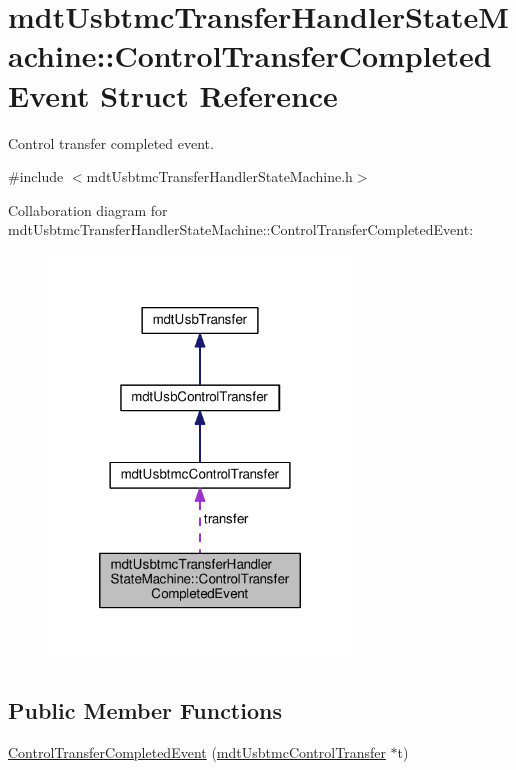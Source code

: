 \hypertarget{structmdt_usbtmc_transfer_handler_state_machine_1_1_control_transfer_completed_event}{\section{mdt\-Usbtmc\-Transfer\-Handler\-State\-Machine\-:\-:Control\-Transfer\-Completed\-Event Struct Reference}
\label{structmdt_usbtmc_transfer_handler_state_machine_1_1_control_transfer_completed_event}
}


Control transfer completed event.  




{\ttfamily \#include $<$mdt\-Usbtmc\-Transfer\-Handler\-State\-Machine.\-h$>$}



Collaboration diagram for mdt\-Usbtmc\-Transfer\-Handler\-State\-Machine\-:\-:Control\-Transfer\-Completed\-Event\-:\nopagebreak
\begin{figure}[H]
\begin{center}
\leavevmode
\includegraphics[width=228pt]{structmdt_usbtmc_transfer_handler_state_machine_1_1_control_transfer_completed_event__coll__graph}
\end{center}
\end{figure}
\subsection*{Public Member Functions}
\begin{DoxyCompactItemize}
\item 
\hyperlink{structmdt_usbtmc_transfer_handler_state_machine_1_1_control_transfer_completed_event_a096399469c22ab81837a459d7396a2d0}{Control\-Transfer\-Completed\-Event} (\hyperlink{classmdt_usbtmc_control_transfer}{mdt\-Usbtmc\-Control\-Transfer} $\ast$t)
\end{DoxyCompactItemize}
